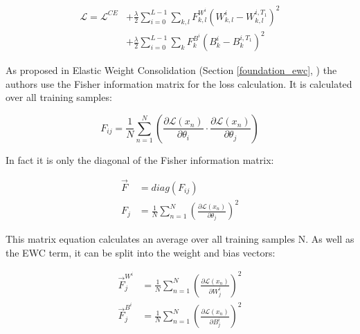 \begin{equation}
    \begin{split}
        \mathcal{L} = \mathcal{L}^{CE}
        & + \frac{\lambda}{2} \sum_{i=0}^{L-1} \sum_{k, l} F_{k, l}^{W^i}\left(W^i_{k, l}-W^{i,{T_1}}_{k, l} \right)^2
        \\
        & +  \frac{\lambda}{2}\sum_{i=0}^{L-1} \sum_{k}F^{B^i}_k\left(B^i_{k}-B^{i,{T_1}}_{k} \right)^2
    \end{split}
\end{equation}

As proposed in Elastic Weight Consolidation (Section \ref{foundation_ewc}, \cite{elastic-weight-consolidation}) the authors use the Fisher information matrix for the loss calculation. It is calculated over all training samples:

\begin{equation}
    F_{ij} = 
    \frac{1}{N} 
    \sum_{n=1}^{N} 
    \left(
        \frac{\partial \mathcal{L} \left( x_n \right) }{\partial \theta_{i}} 
        \cdot 
        \frac{\partial \mathcal{L} \left( x_n \right) }{\partial \theta_{j}}
    \right)
\end{equation}

In fact it is only the diagonal of the Fisher information matrix:

\begin{equation}
    \begin{split}
        \vec{F} & = diag \left( F_{ij} \right)
        \\
        F_{j} & = 
        \frac{1}{N} 
        \sum_{n=1}^{N} 
        \left(
            \frac{\partial \mathcal{L} \left( x_n \right) }{\partial \theta_{j}}
        \right)^2
    \end{split}
\end{equation}

This matrix equation calculates an average over all training samples N.
As well as the EWC term, it can be split into the weight and bias vectors:

\begin{equation}
    \begin{split}
        \vec{F}^{W^i}_j & = 
        \frac{1}{N} 
        \sum_{n=1}^{N} 
        \left(
            \frac{\partial \mathcal{L} \left( x_n \right) }{\partial W^i_{j}}
        \right)^2
        \\
        \vec{F}^{B^i}_j & = 
        \frac{1}{N} 
        \sum_{n=1}^{N} 
        \left(
            \frac{\partial \mathcal{L} \left( x_n \right) }{\partial B^i_{j}}
        \right)^2
    \end{split}
\end{equation}

